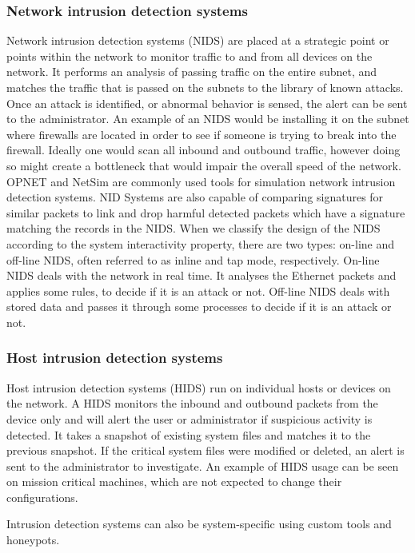 \documentclass[12pt]{article}
\theoremstyle{definition}
\begin{document}
			\subsubsection{Network intrusion detection systems}
			Network intrusion detection systems (NIDS) are placed at a strategic point or points within the network to monitor traffic to and from all devices on the network. It performs an analysis of passing traffic on the entire subnet, and matches the traffic that is passed on the subnets to the library of known attacks. Once an attack is identified, or abnormal behavior is sensed, the alert can be sent to the administrator. An example of an NIDS would be installing it on the subnet where firewalls are located in order to see if someone is trying to break into the firewall. Ideally one would scan all inbound and outbound traffic, however doing so might create a bottleneck that would impair the overall speed of the network. OPNET and NetSim are commonly used tools for simulation network intrusion detection systems. NID Systems are also capable of comparing signatures for similar packets to link and drop harmful detected packets which have a signature matching the records in the NIDS. When we classify the design of the NIDS according to the system interactivity property, there are two types: on-line and off-line NIDS, often referred to as inline and tap mode, respectively. On-line NIDS deals with the network in real time. It analyses the Ethernet packets and applies some rules, to decide if it is an attack or not. Off-line NIDS deals with stored data and passes it through some processes to decide if it is an attack or not.
			
			\subsubsection{Host intrusion detection systems}
			Host intrusion detection systems (HIDS) run on individual hosts or devices on the network. A HIDS monitors the inbound and outbound packets from the device only and will alert the user or administrator if suspicious activity is detected. It takes a snapshot of existing system files and matches it to the previous snapshot. If the critical system files were modified or deleted, an alert is sent to the administrator to investigate. An example of HIDS usage can be seen on mission critical machines, which are not expected to change their configurations.
			
			Intrusion detection systems can also be system-specific using custom tools and honeypots.	
			
\end{document}
